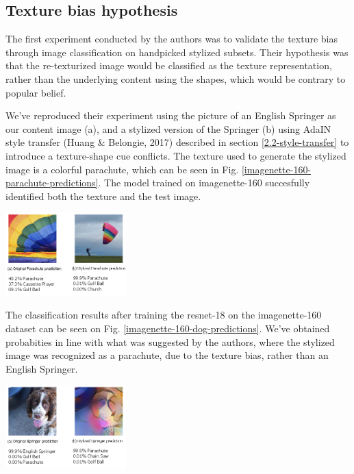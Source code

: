 \documentclass{article}
\begin{document}
\subsection{Texture bias hypothesis}

The first experiment conducted by the authors was to validate the texture bias 
through image classification on handpicked stylized subsets. 
Their hypothesis was that the re-texturized image would be classified as the texture representation, rather than 
the underlying content using the shapes, which would be contrary to popular belief. \medskip \par

\noindent
We've reproduced their experiment using the picture of an English Springer as our content image (a), 
and a stylized version of the Springer (b) using AdaIN style transfer
(Huang \& Belongie, 2017) described in section \ref{2.2-style-transfer}
to introduce a texture-shape cue conflicts.
The texture used to generate the stylized image is a colorful parachute, 
which can be seen in Fig. \ref{imagenette-160-parachute-predictions}. 
The model trained on imagenette-160 succesfully identified both the texture and the test image.
\medskip \par

\begin{center}
  \captionsetup{type=figure}
  \includegraphics[width=0.35\textwidth]{imgs/experiment-1/imagenette-160-parachute-predictions}
  \label{imagenette-160-parachute-predictions}
\end{center}

\noindent
The classification results after training the resnet-18 on the imagenette-160 dataset 
can be seen on Fig. \ref{imagenette-160-dog-predictions}.
We've obtained probabities in line with what was suggested by the authors, 
where the stylized image was recognized as a parachute, 
due to the texture bias, rather than an English Springer. \medskip \par

\begin{center}
  \captionsetup{type=figure}
  \includegraphics[width=0.35\textwidth]{imgs/experiment-1/imagenette-160-dog-predictions}
  \label{imagenette-160-dog-predictions}
\end{center}
\end{document}
